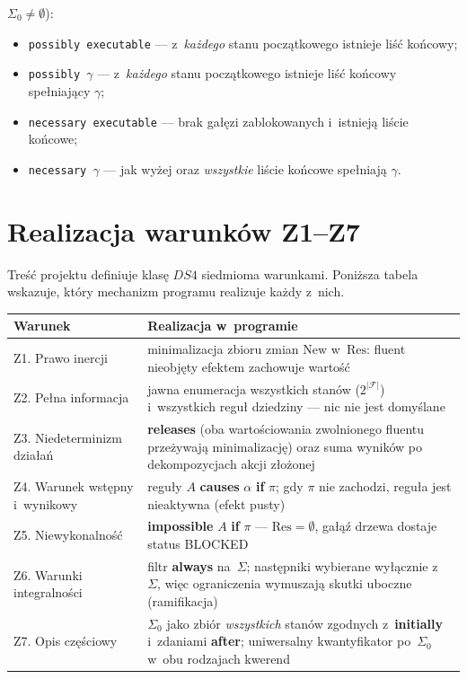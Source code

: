 \documentclass[11pt,a4paper]{article}
\newcommand{\Res}{\mathrm{Res}}
\newcommand{\New}{\mathrm{New}}
\begin{document}
\begin{enumerate}
        $\Sigma_0 \neq \emptyset$):
        \begin{itemize}
          \item \texttt{possibly executable} --- z~\emph{każdego} stanu
                początkowego istnieje liść końcowy;
          \item \texttt{possibly $\gamma$} --- z~\emph{każdego} stanu
                początkowego istnieje liść końcowy spełniający $\gamma$;
          \item \texttt{necessary executable} --- brak gałęzi zablokowanych
                i~istnieją liście końcowe;
          \item \texttt{necessary $\gamma$} --- jak wyżej oraz \emph{wszystkie}
                liście końcowe spełniają $\gamma$.
        \end{itemize}
\end{enumerate}

\section{Realizacja warunków Z1--Z7}

Treść projektu definiuje klasę $\mathit{DS4}$ siedmioma warunkami.
Poniższa tabela wskazuje, który mechanizm programu realizuje każdy z~nich.

\begin{center}
\small
\begin{tabular}{@{}p{4.6cm}p{9.8cm}@{}}
\toprule
\textbf{Warunek} & \textbf{Realizacja w~programie} \\
\midrule
Z1. Prawo inercji &
  minimalizacja zbioru zmian $\New$ w~$\Res$: fluent nieobjęty efektem
  zachowuje wartość \\
Z2. Pełna informacja &
  jawna enumeracja wszystkich stanów ($2^{|\mathcal{F}|}$) i~wszystkich
  reguł dziedziny --- nic nie jest domyślane \\
Z3. Niedeterminizm działań &
  \textbf{releases} (oba wartościowania zwolnionego fluentu przeżywają
  minimalizację) oraz suma wyników po dekompozycjach akcji złożonej \\
Z4. Warunek wstępny i~wynikowy &
  reguły $A$ \textbf{causes} $\alpha$ \textbf{if} $\pi$; gdy $\pi$ nie
  zachodzi, reguła jest nieaktywna (efekt pusty) \\
Z5. Niewykonalność &
  \textbf{impossible} $A$ \textbf{if} $\pi$ --- $\Res = \emptyset$,
  gałąź drzewa dostaje status BLOCKED \\
Z6. Warunki integralności &
  filtr \textbf{always} na~$\Sigma$; następniki wybierane wyłącznie
  z~$\Sigma$, więc ograniczenia wymuszają skutki uboczne (ramifikacja) \\
Z7. Opis częściowy &
  $\Sigma_0$ jako zbiór \emph{wszystkich} stanów zgodnych
  z~\textbf{initially} i~zdaniami \textbf{after}; uniwersalny kwantyfikator
  po~$\Sigma_0$ w~obu rodzajach kwerend \\
\bottomrule
\end{tabular}
\end{center}
\end{document}
